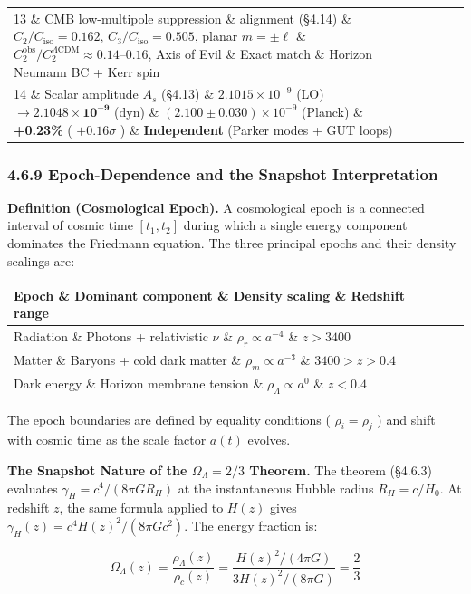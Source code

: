 \documentclass[11pt,a4paper]{article}
\theoremstyle{definition}\newtheorem{definition}{Definition}
\theoremstyle{remark}\newtheorem{remark}{Remark}
\begin{document}
\begin{longtable}{llllll}
13 \& CMB low-multipole suppression \& alignment (§4.14) \& $C_2/C_{\text{iso}} = 0.162$, $C_3/C_{\text{iso}} = 0.505$, planar $m=\pm\ell$ \& $C_2^{\text{obs}}/C_2^{\Lambda\text{CDM}} \approx 0.14\text{--}0.16$, Axis of Evil \& Exact match \& Horizon Neumann BC + Kerr spin \\
14 \& Scalar amplitude $A_s$ (§4.13) \& $2.1015 \times 10^{-9}$ (LO) $\to \mathbf{2.1048 \times 10^{-9}}$ (dyn) \& $(2.100 \pm 0.030) \times 10^{-9}$ (Planck) \& \textbf{+0.23\%} ( $+0.16\sigma$ ) \& \textbf{Independent} (Parker modes + GUT loops) \\
\hline
\end{longtable}\subsubsection{4.6.9 Epoch-Dependence and the Snapshot Interpretation}

\textbf{Definition (Cosmological Epoch).} A cosmological epoch is a connected interval of cosmic time $[t_1, t_2]$ during which a single energy component dominates the Friedmann equation. The three principal epochs and their density scalings are:

\begin{longtable}{llll}
\hline
Epoch \& Dominant component \& Density scaling \& Redshift range \\
\hline
Radiation \& Photons + relativistic $\nu$ \& $\rho_r \propto a^{-4}$ \& $z > 3400$ \\
Matter \& Baryons + cold dark matter \& $\rho_m \propto a^{-3}$ \& $3400 > z > 0.4$ \\
Dark energy \& Horizon membrane tension \& $\rho_\Lambda \propto a^{0}$ \& $z < 0.4$ \\
\hline
\end{longtable}
The epoch boundaries are defined by equality conditions ( $\rho_i = \rho_j$ ) and shift with cosmic time as the scale factor $a(t)$ evolves.

\textbf{The Snapshot Nature of the $\Omega_\Lambda = 2/3$ Theorem.} The theorem (§4.6.3) evaluates $\gamma_H = c^4/(8\pi G R_H)$ at the instantaneous Hubble radius $R_H = c/H_0$. At redshift $z$, the same formula applied to $H(z)$ gives $\gamma_H(z) = c^4 H(z)^2 / (8\pi G c^2)$. The energy fraction is:


\begin{equation}
\Omega_\Lambda(z) = \frac{\rho_\Lambda(z)}{\rho_c(z)} = \frac{H(z)^2/(4\pi G)}{3H(z)^2/(8\pi G)} = \frac{2}{3}
\end{equation}
\end{document}
